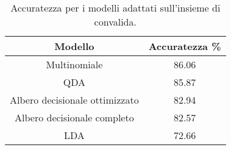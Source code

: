 \begin{table}[H]
\centering
\caption{Accuratezza per i modelli adattati sull'insieme di convalida.}
\begin{tabular}{cc}
\toprule
                        Modello &  Accuratezza \%  \\
\midrule
                   Multinomiale &          86.06 \\
                            QDA &          85.87 \\
 Albero decisionale ottimizzato &          82.94 \\
    Albero decisionale completo &          82.57 \\
                            LDA &          72.66 \\
\bottomrule
\end{tabular}
\label{tab:acc}
\end{table}
